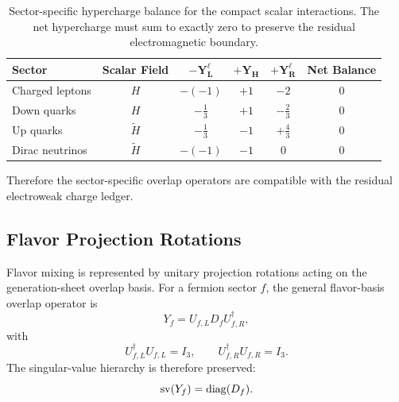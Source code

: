 \documentclass[11pt]{article}
\renewcommand{\arraystretch}{1.22}
\renewcommand{\arraystretch}{1.4}
\begin{document}
\begin{table}[ht!]
\centering
\caption{Sector-specific hypercharge balance for the compact scalar interactions. The net hypercharge must sum to exactly zero to preserve the residual electromagnetic boundary.}
\label{tab:pr2_hypercharge_balance}
\small
\renewcommand{\arraystretch}{1.5}
\begin{tabular}{lccccc}
\hline\hline
\textbf{Sector} & \textbf{Scalar Field} & \(\boldsymbol{-Y_L^\ell}\) & \(\boldsymbol{+ Y_H}\) & \(\boldsymbol{+ Y_R^\ell}\) & \textbf{Net Balance} \\ \hline
Charged leptons & \(H\)             & \(-(-1)\)        & \(+1\) & \(-2\)           & \(0\) \\
Down quarks     & \(H\)             & \(-\frac{1}{3}\) & \(+1\) & \(-\frac{2}{3}\) & \(0\) \\
Up quarks       & \(\widetilde{H}\) & \(-\frac{1}{3}\) & \(-1\) & \(+\frac{4}{3}\) & \(0\) \\
Dirac neutrinos & \(\widetilde{H}\) & \(-(-1)\)        & \(-1\) & \(0\)            & \(0\) \\ \hline\hline
\end{tabular}
\end{table}
Therefore the sector-specific overlap operators are compatible with the residual electroweak charge ledger.

\subsection{Flavor Projection Rotations}
\label{sec:pr2_flavor_projection_rotations}

Flavor mixing is represented by unitary projection rotations acting on the generation-sheet overlap basis. 
For a fermion sector \(f\), the general flavor-basis overlap operator is
\begin{equation}
\boxed{
Y_f
=
U_{f,L}
D_f
U_{f,R}^{\dagger},
}
\end{equation}
with
\begin{equation}
U_{f,L}^{\dagger}U_{f,L}
=
I_3,
\qquad
U_{f,R}^{\dagger}U_{f,R}
=
I_3.
\end{equation}
The singular-value hierarchy is therefore preserved:
\begin{equation}
{\rm sv}(Y_f)
=
{\rm diag}(D_f).
\end{equation}
\end{document}
